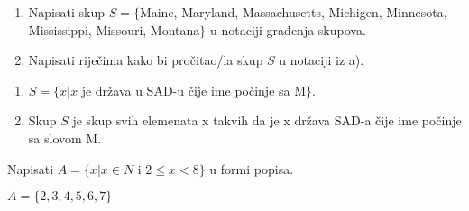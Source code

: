 \documentclass[a4paper, 14pt]{article}
\newcounter{counter}
\newcommand{\examplecounter}{\textbf{\refstepcounter{counter}PRIMJER \thecounter}}
\begin{document}
\begin{tcolorbox}[title=\large \examplecounter \hfill\small\textbf{"Forma popisa u notaciji građenja skupova"}]
\begin{enumerate}[label=\alph*),leftmargin=0.5cm]
\item Napisati skup $S = \{$Maine, Maryland, Massachusetts, Michigen, Minnesota, Mississippi, Missouri, Montana$\}$ u notaciji građenja skupova.
\item Napisati riječima kako bi pročitao/la skup $S$ u notaciji iz a).
\end{enumerate}
\begin{tcolorbox}[title=\small \textbf{RJEŠENJE},colback=white]
\begin{center}
\begin{enumerate}[label=\alph*),leftmargin=0.5cm]
\item $S=\{x|x$ je država u SAD-u čije ime počinje sa M$\}$.
\item Skup $S$ je skup svih elemenata x takvih da je x država SAD-a čije ime počinje sa slovom M.
\end{enumerate}
\end{center}
\end{tcolorbox}
\end{tcolorbox}

\begin{tcolorbox}[title=\large \examplecounter \hfill\small\textbf{"Notacija građenja skupova u formi popisa"}]
Napisati $A=\{x|x\in N$ i $2\leqslant x<8\}$ u formi popisa.
\begin{tcolorbox}[title=\small \textbf{RJEŠENJE},colback=white]
\begin{center}
$A=\{2, 3, 4, 5, 6, 7\}$
\end{center}
\end{tcolorbox}
\end{tcolorbox}
\end{document}

